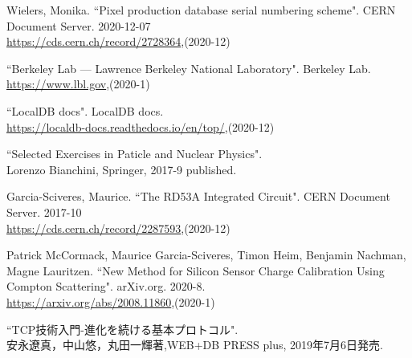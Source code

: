 \begin{thebibliography}{9}
Wielers, Monika. ``Pixel production database serial numbering scheme". CERN Document Server. 2020-12-07\\
\url{https://cds.cern.ch/record/2728364},(2020-12)

``Berkeley Lab — Lawrence Berkeley National Laboratory". Berkeley Lab. \\
\url{https://www.lbl.gov},(2020-1)

``LocalDB docs". LocalDB docs. \\
\url{https://localdb-docs.readthedocs.io/en/top/},(2020-12)

``Selected Exercises in Paticle and Nuclear Physics".\\
Lorenzo Bianchini, Springer, 2017-9 published.

Garcia-Sciveres, Maurice. ``The RD53A Integrated Circuit". CERN Document Server. 2017-10\\
\url{https://cds.cern.ch/record/2287593},(2020-12)

Patrick McCormack, Maurice Garcia-Sciveres, Timon Heim, Benjamin Nachman, Magne Lauritzen. ``New Method for Silicon Sensor Charge Calibration Using Compton Scattering". arXiv.org. 2020-8.\\
\url{https://arxiv.org/abs/2008.11860},(2020-1)

``TCP技術入門-進化を続ける基本プロトコル".\\
安永遼真，中山悠，丸田一輝著,WEB+DB PRESS plus, 2019年7月6日発売.

\end{thebibliography}
